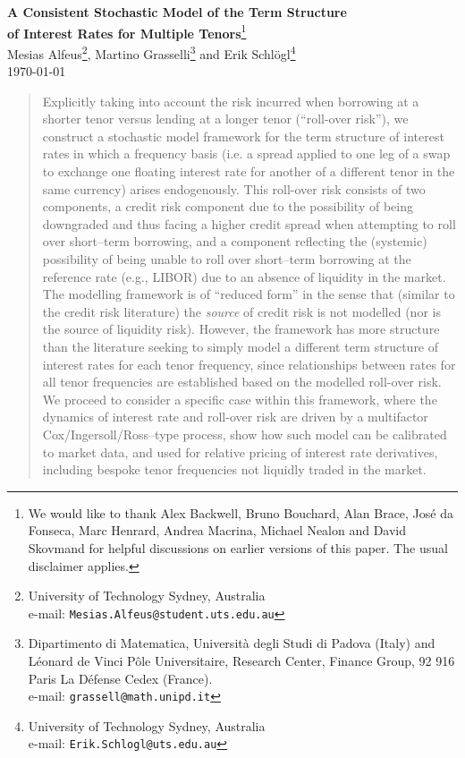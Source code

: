 \documentclass[12pt,a4paper]{article}
\theoremstyle{plain}
\numberwithin{equation}{section}
\begin{document}
\renewcommand{\thefootnote}{\fnsymbol{footnote}}
\begin{center}
{\Large\textbf{A Consistent Stochastic Model of the Term Structure\\[1ex] of Interest Rates for Multiple Tenors}}\footnote{We would like to thank Alex Backwell, Bruno Bouchard, Alan Brace, Jos\'e da Fonseca, Marc Henrard, Andrea Macrina, Michael Nealon and David Skovmand for helpful discussions on earlier versions of this paper. The usual disclaimer applies.}\\[1em]
{\Large Mesias Alfeus\footnote{University of Technology Sydney, Australia\\ e-mail: {\texttt{Mesias.Alfeus@student.uts.edu.au}}}, Martino Grasselli\footnote{Dipartimento di Matematica, Universit\`a degli Studi di Padova (Italy) and L\'eonard de Vinci P\^ole Universitaire,
Research Center, Finance Group, 92 916 Paris La D\'efense Cedex (France).\\ e-mail:
{\texttt{grassell@math.unipd.it}}} and Erik Schl\"ogl\footnote{University of Technology Sydney, Australia\\ e-mail: {\texttt{Erik.Schlogl@uts.edu.au}}}}\\[2em]
\today
\end{center}
\renewcommand*{\thefootnote}{\arabic{footnote}}
\setcounter{footnote}{0}
\begin{abstract}
Explicitly taking into account the risk incurred when borrowing at a shorter tenor versus lending at a longer tenor (``roll-over risk''), we construct a stochastic model framework for the term structure of interest rates in which a frequency basis (i.e. a spread applied to one leg of a swap to exchange one floating interest rate for another of a different tenor in the same currency) arises endogenously. This roll-over risk consists of two components, a credit risk component due to the possibility of being downgraded and thus facing a higher credit spread when attempting to roll over short--term borrowing, and a component reflecting the (systemic) possibility of being unable to roll over short--term borrowing at the reference rate (e.g., LIBOR) due to an absence of liquidity in the market. The modelling framework is of ``reduced form'' in the sense that (similar to the credit risk literature) the \emph{source} of credit risk is not modelled (nor is the source of liquidity risk). However, the framework has more structure than the literature seeking to simply model a different term structure of interest rates for each tenor frequency, since relationships between rates for all tenor frequencies are established based on the modelled roll-over risk. We proceed to consider a specific case within this framework, where the dynamics of interest rate and roll-over risk are driven by a multifactor Cox/Ingersoll/Ross--type process, show how such model can be calibrated to market data, and used for relative pricing of interest rate derivatives, including bespoke tenor frequencies not liquidly traded in the market.
\end{abstract}
\end{document}
